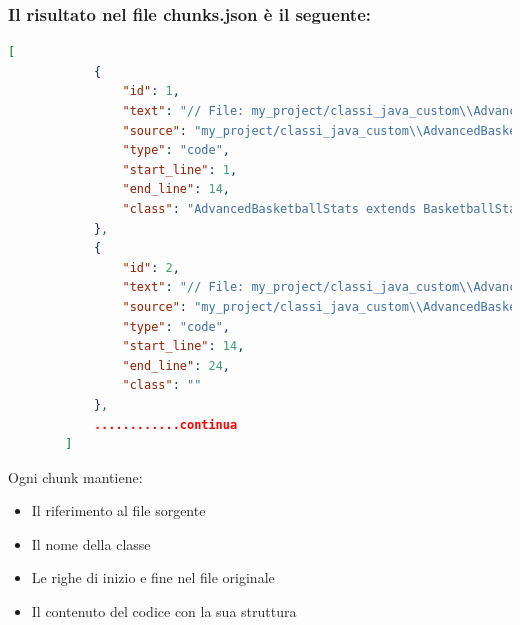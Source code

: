 \documentclass[12pt,a4paper,openright,twoside]{book}
\begin{document}
\subsubsection{Il risultato nel file chunks.json è il seguente:}
    \begin{lstlisting}[language=json,firstnumber=1, caption={Esempio di chunks generati}, label={lst:chunks-example}]
        [
            {
                "id": 1,
                "text": "// File: my_project/classi_java_custom\\AdvancedBasketballStats.java\nClasse: AdvancedBasketballStats extends BasketballStats\npackage classi_java_custom;\nimport java.time.LocalDate;\nimport java.util.Arrays;\npublic class AdvancedBasketballStats extends BasketballStats {\n    \n    // Override con formula avanzata PER\n    @Override\n    public double calcolaEfficienzaGiocatore(int punti, int rimbalzi, int assist, \n                                           int pallePerse, int tiriSbagliati) {\n        return (punti * 1.2 + rimbalzi * 1.1 + assist * 1.3) - \n              (pallePerse * 0.9 + tiriSbagliati * 0.7);\n    }",
                "source": "my_project/classi_java_custom\\AdvancedBasketballStats.java",
                "type": "code",
                "start_line": 1,
                "end_line": 14,
                "class": "AdvancedBasketballStats extends BasketballStats\n"
            },
            {
                "id": 2,
                "text": "// File: my_project/classi_java_custom\\AdvancedBasketballStats.java\n(pallePerse * 0.9 + tiriSbagliati * 0.7);\n    }\n    \n    // Override con valutazione dettagliata\n    @Override\n    public String valutaTiro(double distanzaCanestro, int pressioneDifensiva) {\n        if (distanzaCanestro < 1.5 && pressioneDifensiva < 4) {\n            return \" Tiro ad alto rendimento (85% successo) \";\n        } else if (distanzaCanestro >= 7.0 && pressioneDifensiva > 6) {\n            return \" Tiro ad alto rischio (30% successo) \";\n        }",
                "source": "my_project/classi_java_custom\\AdvancedBasketballStats.java",
                "type": "code",
                "start_line": 14,
                "end_line": 24,
                "class": ""
            },
            ............continua
        ]
    \end{lstlisting}
        
    Ogni chunk mantiene:
    \begin{itemize}
        \item Il riferimento al file sorgente
        \item Il nome della classe
        \item Le righe di inizio e fine nel file originale
        \item Il contenuto del codice con la sua struttura
    \end{itemize}
\end{document}
